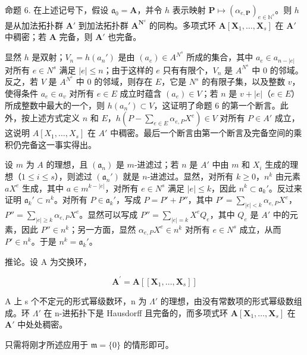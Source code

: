命题 6. 在上述记号下，假设 \(\mathfrak{a}_0 = \mathbf{A}\)，并令 \(h\) 表示映射 \(\mathbf{P} \mapsto (\alpha_{e,\mathbf{P}})_{e \in \mathbb{N}^s}\)。则 \(h\) 是从加法拓扑群 \(\mathbf{A}'\) 到加法拓扑群 \(\mathbf{A}^{\mathbf{N}^s}\) 的同构。多项式环 \(\mathbf{A}[\mathbf{X}_1, \ldots, \mathbf{X}_s]\) 在 \(\mathbf{A}'\) 中稠密；若 \(\mathbf{A}\) 完备，则 \(\mathbf{A}'\) 也完备。

	显然 \(h\) 是双射；\(V_n = h(a_n')\) 是由 \((a_e) \in A^{N^s}\) 所成的集合，其中 \(a_e \in a_{n-|e|}\) 对所有 \(e \in N^s\) 满足 \(|e| \leqslant n\)；由于这样的 \(e\) 只有有限个，\(V_n\) 是 \(A^{N^s}\) 中 0 的邻域。反之，若 \(V\) 是 \(A^{N^s}\) 中 0 的邻域，则存在 \(E\)，它是 \(N^s\) 的有限子集，以及整数 \(v\)，使得条件 \(a_e \in a_v\) 对所有 \(e \in E\) 成立时蕴含 \((a_e) \in V\)；若 \(n\) 是 \(v + |e|\)（\(e \in E\)）所成整数中最大的一个，则 \(h(a_n') \subset V\)，这证明了命题 6 的第一个断言。此外，按上述方式定义 \(n\) 和 \(E\)，\(h(P - \sum_{e \in E} \alpha_{e, P} X^e) \in V\) 对所有 \(P \in A'\) 成立，这说明 \(A[X_1, \ldots, X_s]\) 在 \(A'\) 中稠密。最后一个断言由第一个断言及完备空间的乘积仍完备这一事实得出。

	设 \(m\) 为 \(A\) 的理想，且 \((\mathfrak{a}_n)\) 是 \(m\)-进滤过；若 \(n\) 是 \(A'\) 中由 \(m\) 和 \(X_i\) 生成的理想（\(1 \leqslant i \leqslant s\)），则滤过 \((\mathfrak{a}_n')\) 就是 \(n\)-进滤过。显然，对所有 \(k \geqslant 0\)，\(n^k\) 由元素 \(aX^e\) 生成，其中 \(a \in m^{k-|e|}\)，对所有 \(e \in N^s\) 满足 \(|e| \leqslant k\)，因此 \(n^k \subset \mathfrak{a}_k'\)。反过来证明 \(\mathfrak{a}_k' \subset n^k\)。对所有 \(P \in \mathfrak{a}_k'\)，写成 \(P = P' + P''\)，其中 \(P' = \sum_{|e| < k} \alpha_{e,P} X^e\)，\(P'' = \sum_{|e| \geqslant k} \alpha_{e,P} X^e\)。显然可以写成 \(P'' = \sum_{|e|=k} X^e Q_e\)，其中 \(Q_e\) 是 \(A'\) 中的元素，因此 \(P'' \in n^k\)；另一方面，显然 \(\alpha_{e,P} X^e \in n^k\) 对所有 \(e \in N^s\) 成立，从而 \(P' \in n^k\)。于是 \(n^k = \mathfrak{a}_k'\)。

推论。设 A 为交换环，

\[
\mathbf {A} ^ {\prime} = \mathbf {A} [ [ \mathbf {X} _ {1}, \dots , \mathbf {X} _ {s} ] ]
\]

A 上 s 个不定元的形式幂级数环，n 为 \(\Lambda'\) 的理想，由没有常数项的形式幂级数组成。环 \(\Lambda'\) 在 n-进拓扑下是 Hausdorff 且完备的，而多项式环 \(\mathbf{A}[\mathbf{X}_1,\dots ,\mathbf{X}_s]\) 在 \(\mathbf{A}'\) 中处处稠密。

只需将刚才所述应用于 \(\mathfrak{m} = \{0\}\) 的情形即可。

